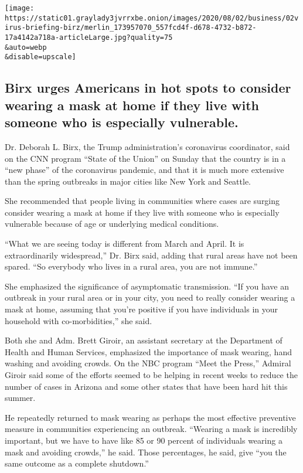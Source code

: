 \texttt{[image: https://static01.graylady3jvrrxbe.onion/images/2020/08/02/business/02virus-briefing-birz/merlin\_173957070\_557fcd4f-d678-4732-b872-17a4142a718a-articleLarge.jpg?quality=75\\\&auto=webp\\\&disable=upscale]}

\hypertarget{birx-urges-americans-in-hot-spots-to-consider-wearing-a-mask-at-home-if-they-live-with-someone-who-is-especially-vulnerable}{%
\subsection{Birx urges Americans in hot spots to consider wearing a mask
at home if they live with someone who is especially
vulnerable.}\label{birx-urges-americans-in-hot-spots-to-consider-wearing-a-mask-at-home-if-they-live-with-someone-who-is-especially-vulnerable}}

Dr. Deborah L. Birx, the Trump administration's coronavirus coordinator,
said on the CNN program ``State of the Union'' on Sunday that the
country is in a ``new phase'' of the coronavirus pandemic, and that it
is much more extensive than the spring outbreaks in major cities like
New York and Seattle.

She recommended that people living in communities where cases are
surging consider wearing a mask at home if they live with someone who is
especially vulnerable because of age or underlying medical conditions.

``What we are seeing today is different from March and April. It is
extraordinarily widespread,'' Dr. Birx said, adding that rural areas
have not been spared. ``So everybody who lives in a rural area, you are
not immune.''

She emphasized the significance of asymptomatic transmission. ``If you
have an outbreak in your rural area or in your city, you need to really
consider wearing a mask at home, assuming that you're positive if you
have individuals in your household with co-morbidities,'' she said.

Both she and Adm. Brett Giroir, an assistant secretary at the Department
of Health and Human Services, emphasized the importance of mask wearing,
hand washing and avoiding crowds. On the NBC program ``Meet the Press,''
Admiral Giroir said some of the efforts seemed to be helping in recent
weeks to reduce the number of cases in Arizona and some other states
that have been hard hit this summer.

He repeatedly returned to mask wearing as perhaps the most effective
preventive measure in communities experiencing an outbreak. ``Wearing a
mask is incredibly important, but we have to have like 85 or 90 percent
of individuals wearing a mask and avoiding crowds,'' he said. Those
percentages, he said, give ``you the same outcome as a complete
shutdown.''

